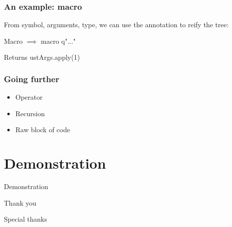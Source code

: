 \documentclass{beamer}
\begin{document}

\begin{frame}
\frametitle{An example: macro}

From symbol, arguments, type, we can use the annotation to reify the tree:
\begin{block}{Macro}
 $\implies$ macro q"..."
\end{block}

\begin{block}{Returns}
ustArgs.apply(1)
\end{block}

\end{frame}


\begin{frame}
\frametitle{Going further}

\begin{itemize}
\item Operator
\item Recursion
\item Raw block of code
\end{itemize}

\end{frame}

\section{Demonstration}
\begin{frame}
\Huge{\centerline{Demonstration}}
\end{frame}


\begin{frame}
\Huge{\centerline{Thank you}}
\end{frame}


\begin{frame}
\Huge{\centerline{Special thanks}}
\end{frame}


%
\end{document}

